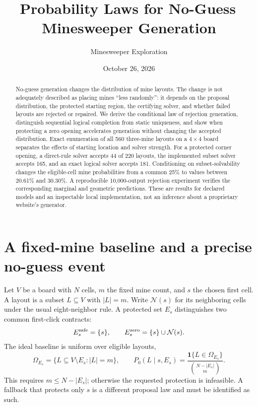 \documentclass[11pt]{article}
\title{Probability Laws for No-Guess\, Minesweeper Generation}
\author{Minesweeper Exploration}
\date{October 26, 2026}
\newcommand{\ind}{\mathbf 1}
\begin{document}
\maketitle
\begin{abstract}
No-guess generation changes the distribution of mine layouts. The change is not adequately described as placing mines ``less randomly'': it depends on the proposal distribution, the protected starting region, the certifying solver, and whether failed layouts are rejected or repaired. We derive the conditional law of rejection generation, distinguish sequential logical completion from static uniqueness, and show when protecting a zero opening accelerates generation without changing the accepted distribution. Exact enumeration of all 560 three-mine layouts on a $4\times4$ board separates the effects of starting location and solver strength. For a protected corner opening, a direct-rule solver accepts 44 of 220 layouts, the implemented subset solver accepts 165, and an exact logical solver accepts 181. Conditioning on subset-solvability changes the eligible-cell mine probabilities from a common 25\% to values between 20.61\% and 30.30\%. A reproducible 10,000-output rejection experiment verifies the corresponding marginal and geometric predictions. These are results for declared models and an inspectable local implementation, not an inference about a proprietary website's generator.
\end{abstract}

\section{A fixed-mine baseline and a precise no-guess event}

Let $V$ be a board with $N$ cells, $m$ the fixed mine count, and $s$ the chosen first cell. A layout is a subset $L\subseteq V$ with $|L|=m$. Write $\mathcal N(s)$ for its neighboring cells under the usual eight-neighbor rule. A protected set $E_s$ distinguishes two common first-click contracts:
\[
 E_s^{\rm safe}=\{s\},\qquad
 E_s^{\rm zero}=\{s\}\cup\mathcal N(s).
\]
The ideal baseline is uniform over eligible layouts,
\begin{equation}
 \Omega_{E_s}=\{L\subseteq V\setminus E_s:|L|=m\},\qquad
 P_0(L\mid s,E_s)=\frac{\ind\{L\in\Omega_{E_s}\}}{\binom{N-|E_s|}{m}}.
 \label{eq:baseline}
\end{equation}
This requires $m\le N-|E_s|$; otherwise the requested protection is infeasible. A fallback that protects only $s$ is a different proposal law and must be identified as such.
\end{document}
